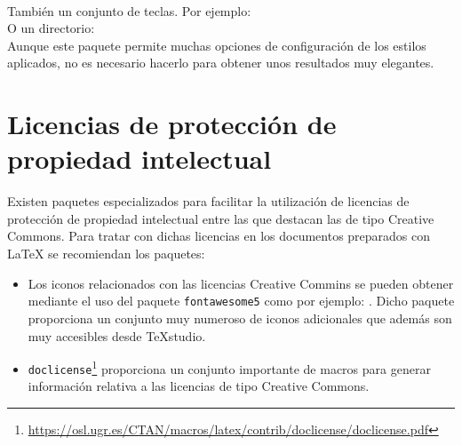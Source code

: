 \documentclass[ 		%
	11pt,				%
	a4paper,			%
	twoside,			%
	openright,			%
	final       		%
]{book}
\begin{document}
\noindent {}\\

\noindent También un conjunto de teclas. Por ejemplo:
\\

\noindent O un directorio:
\\

\noindent Aunque este paquete permite muchas opciones de configuración de los estilos aplicados, no es necesario hacerlo para obtener unos resultados muy elegantes.



\section{Licencias de protección de propiedad intelectual}
Existen paquetes especializados para facilitar la utilización de licencias de protección de propiedad intelectual entre las que destacan las de tipo Creative Commons. Para tratar con dichas licencias en los documentos preparados con \LaTeX{} se recomiendan los paquetes:
\begin{itemize}
\item Los iconos relacionados con las licencias Creative Commins se pueden obtener mediante el uso del paquete \texttt{fontawesome5} como por ejemplo: \faCreativeCommons{} \faCreativeCommonsBy{} \faCreativeCommonsNcEu{} \faCreativeCommonsSa . Dicho paquete proporciona un conjunto muy numeroso de iconos adicionales que además son muy accesibles desde \TeX studio.

\item \texttt{doclicense}\footnote{\url{https://osl.ugr.es/CTAN/macros/latex/contrib/doclicense/doclicense.pdf}} proporciona un conjunto importante de macros para generar información relativa a las licencias de tipo Creative Commons.
\end{itemize}

\doclicenseThis %
\end{document}
